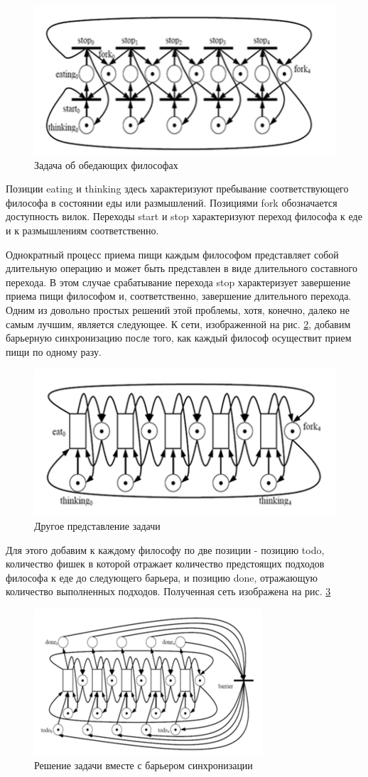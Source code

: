 \begin{figure}[ht]
\centerline{\includegraphics[width=0.5\linewidth]{images/image10.png}}
\caption{Задача об обедающих философах}
\label{fig10}
\end{figure}

Позиции eating и thinking здесь характеризуют пребывание соответствующего философа в состоянии еды или размышлений. Позициями fork обозначается доступность вилок. Переходы start и stop характеризуют переход философа к еде и к размышлениям соответственно. 

Однократный процесс приема пищи каждым философом представляет собой длительную операцию и может быть представлен в виде длительного составного перехода. В этом случае срабатывание перехода stop характеризует завершение приема пищи философом и, соответственно, завершение длительного перехода. Одним из довольно простых решений этой проблемы, хотя, конечно, далеко не самым лучшим, является следующее. К сети, изображенной на рис. \ref{fig11}, добавим барьерную синхронизацию после того, как каждый философ осуществит прием пищи по одному разу.

\begin{figure}[ht]
\centerline{\includegraphics[width=0.5\linewidth]{images/image11.png}}
\caption{Другое представление задачи}
\label{fig11}
\end{figure}

Для этого добавим к каждому философу по две позиции - позицию todo, количество фишек в которой отражает количество предстоящих подходов философа к еде до следующего барьера, и позицию done, отражающую количество выполненных подходов. Полученная сеть изображена на рис. \ref{fig12}

\begin{figure}[ht]
\centerline{\includegraphics[width=0.5\linewidth]{images/image12.png}}
\caption{Решение задачи вместе с барьером синхронизации}
\label{fig12}
\end{figure}

